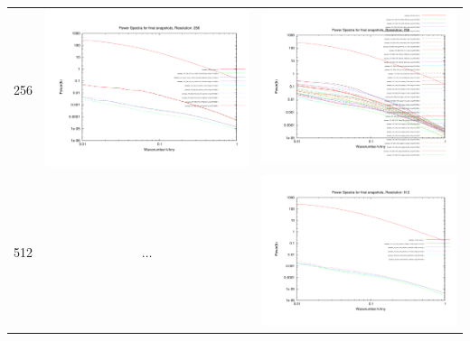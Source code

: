 \documentclass[a4paper,11pt,fleqn,oneside]{book}
\begin{document}
\begin{itemize}
\begin{table}
\begin{tabular}{l|c|c}
 256 & \includegraphics[scale=0.2]{analysis/powerspectra/fin_powspec_combined_256_h70.pdf} & \includegraphics[scale=0.2]{analysis/powerspectra/fin_powspec_combined_256_h100.pdf} \\
 512 & $\dots$ & \includegraphics[scale=0.2]{analysis/powerspectra/fin_powspec_combined_512_h100.pdf} \\


\end{tabular}
\end{table}
\end{itemize}
\end{document}
